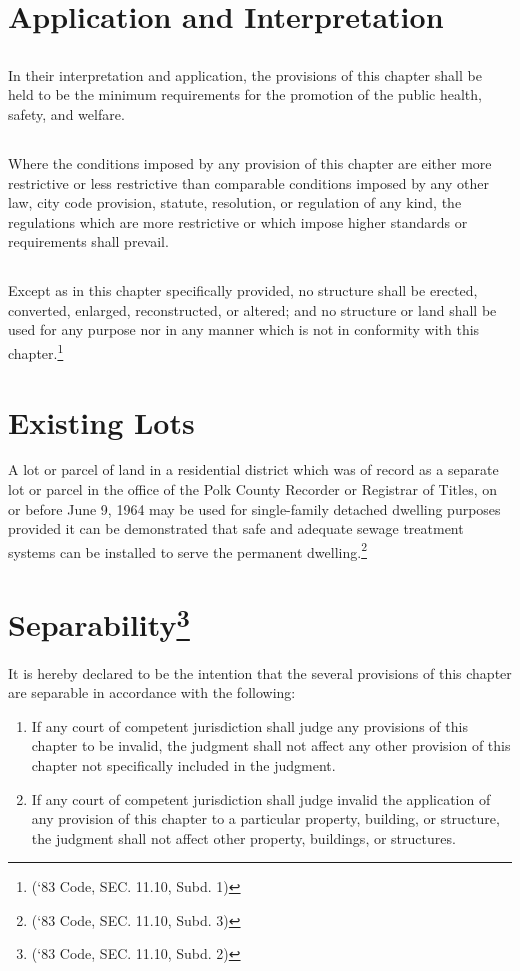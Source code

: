 \section{Application and Interpretation}
\subsection{}
In their interpretation and application, the provisions of this chapter shall be held to be the minimum requirements for the promotion of the public health, safety, and welfare.
\subsection{}
Where the conditions imposed by any provision of this chapter are either more restrictive or less restrictive than comparable conditions imposed by any other law, city code provision, statute, resolution, or regulation of any kind, the regulations which are more restrictive or which impose higher standards or requirements shall prevail.
\subsection{}
Except as in this chapter specifically provided, no structure shall be erected, converted, enlarged, reconstructed, or altered; and no structure or land shall be used for any purpose nor in any manner which is not in conformity with this chapter.\footnote{(‘83 Code, SEC. 11.10, Subd. 1)}
\section{Existing Lots}
A lot or parcel of land in a residential district which was of record as a separate lot or parcel in the office of the Polk County Recorder or Registrar of Titles, on or before June 9, 1964 may be used for single-family detached dwelling purposes provided it can be demonstrated that safe and adequate sewage treatment systems can be installed to serve the permanent dwelling.\footnote{(‘83 Code, SEC. 11.10, Subd. 3)}
\section{Separability\footnote{(‘83 Code, SEC. 11.10, Subd. 2)}}
It is hereby declared to be the intention that the several provisions of this chapter are separable in accordance with the following:
\begin{enumerate}[{\indent}A)]
    \item If any court of competent jurisdiction shall judge any provisions of this chapter to be invalid, the judgment shall not affect any other provision of this chapter not specifically included in the judgment.
    \item If any court of competent jurisdiction shall judge invalid the application of any provision of this chapter to a particular property, building, or structure, the judgment shall not affect other property, buildings, or structures.
\end{enumerate}
